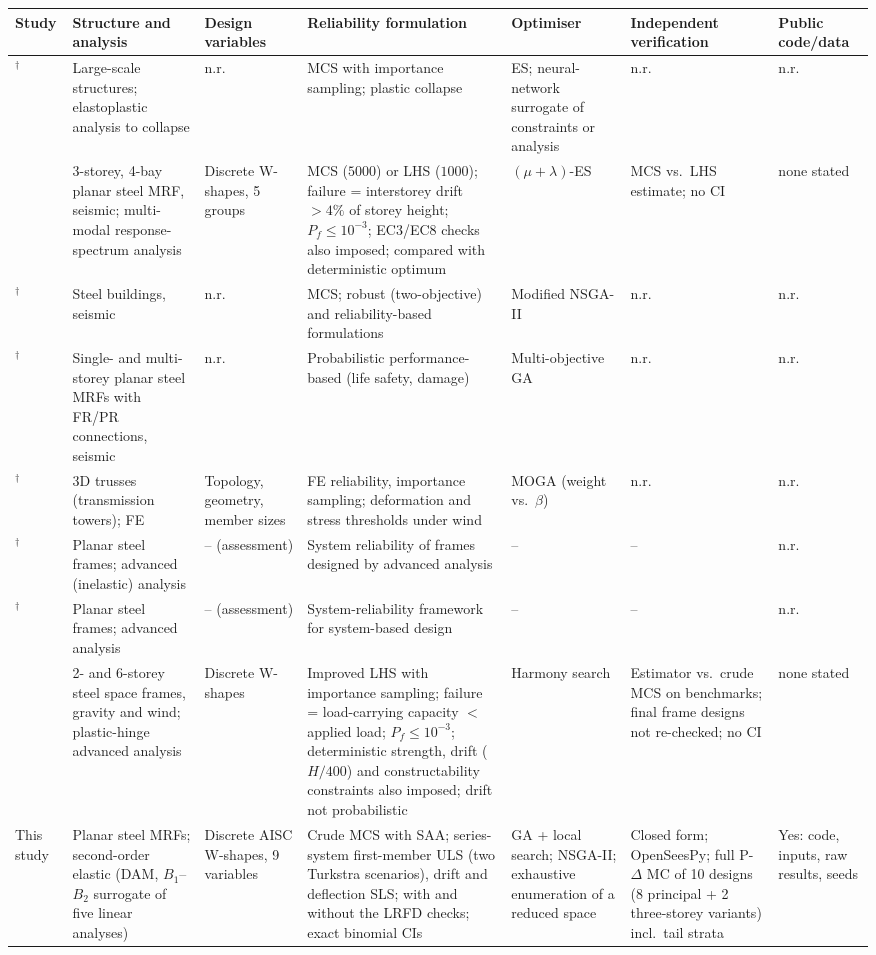 \begin{tabular}{p{2.3cm}p{2.6cm}p{1.9cm}p{3.0cm}p{1.9cm}p{2.2cm}p{1.3cm}}
\toprule
Study & Structure and analysis & Design variables & Reliability formulation & Optimiser & Independent verification & Public code/data \\
\midrule
\citet{PapadrakakisLagaros2002}$^\dagger$ & Large-scale structures; elastoplastic analysis to collapse & n.r. & MCS with importance sampling; plastic collapse & ES; neural-network surrogate of constraints or analysis & n.r. & n.r. \\
\citet{Papadrakakis2004} & 3-storey, 4-bay planar steel MRF, seismic; multi-modal response-spectrum analysis & Discrete W-shapes, 5 groups & MCS ($5000$) or LHS ($1000$); failure = interstorey drift $>4\%$ of storey height; $P_f\le10^{-3}$; EC3/EC8 checks also imposed; compared with deterministic optimum & $(\mu+\lambda)$-ES & MCS vs.\ LHS estimate; no CI & none stated \\
\citet{LagarosPapadrakakis2007}$^\dagger$ & Steel buildings, seismic & n.r. & MCS; robust (two-objective) and reliability-based formulations & Modified NSGA-II & n.r. & n.r. \\
\citet{Foley2007}$^\dagger$ & Single- and multi-storey planar steel MRFs with FR/PR connections, seismic & n.r. & Probabilistic performance-based (life safety, damage) & Multi-objective GA & n.r. & n.r. \\
\citet{Mathakari2007}$^\dagger$ & 3D trusses (transmission towers); FE & Topology, geometry, member sizes & FE reliability, importance sampling; deformation and stress thresholds under wind & MOGA (weight vs.\ $\beta$) & n.r. & n.r. \\
\citet{Buonopane2006}$^\dagger$ & Planar steel frames; advanced (inelastic) analysis & -- (assessment) & System reliability of frames designed by advanced analysis & -- & -- & n.r. \\
\citet{Zhang2016}$^\dagger$ & Planar steel frames; advanced analysis & -- (assessment) & System-reliability framework for system-based design & -- & -- & n.r. \\
\citet{TruongKim2017} & 2- and 6-storey steel space frames, gravity and wind; plastic-hinge advanced analysis & Discrete W-shapes & Improved LHS with importance sampling; failure = load-carrying capacity $<$ applied load; $P_f\le10^{-3}$; deterministic strength, drift ($H/400$) and constructability constraints also imposed; drift not probabilistic & Harmony search & Estimator vs.\ crude MCS on benchmarks; final frame designs not re-checked; no CI & none stated \\
\midrule
This study & Planar steel MRFs; second-order elastic (DAM, $B_1$--$B_2$ surrogate of five linear analyses) & Discrete AISC W-shapes, 9 variables & Crude MCS with SAA; series-system first-member ULS (two Turkstra scenarios), drift and deflection SLS; with and without the LRFD checks; exact binomial CIs & GA + local search; NSGA-II; exhaustive enumeration of a reduced space & Closed form; OpenSeesPy; full P-$\Delta$ MC of 10 designs (8 principal + 2 three-storey variants) incl.\ tail strata & Yes: code, inputs, raw results, seeds \\
\bottomrule
\end{tabular}
